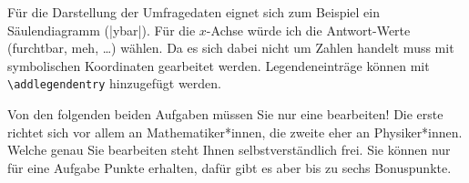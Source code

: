 \documentclass{scrartcl}
\begin{document}
\begin{solution}
\noindent Für die Darstellung der Umfragedaten eignet sich zum Beispiel ein Säulendiagramm (|ybar|). Für die $x$-Achse würde ich die Antwort-Werte (furchtbar, meh, …) wählen. Da es sich dabei nicht um Zahlen handelt muss mit symbolischen Koordinaten gearbeitet werden. Legendeneinträge können mit \texttt{\textbackslash addlegendentry} hinzugefügt werden.

\noindent\usebox\SolutionCodeA
\end{solution}

\vspace{\baselineskip}




\noindent Von den folgenden beiden Aufgaben müssen Sie nur eine bearbeiten! Die erste richtet sich vor allem an Mathematiker*innen, die zweite eher an Physiker*innen. Welche genau Sie bearbeiten steht Ihnen selbstverständlich frei. Sie können nur für eine Aufgabe Punkte erhalten, dafür gibt es aber bis zu sechs Bonuspunkte.\\
\end{document}
